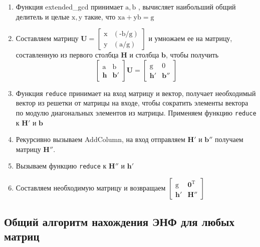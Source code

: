 \begin{enumerate}
\item Функция extended\_gcd принимает $ \mathrm{a, b} $ , вычисляет наибольший общий делитель и целые $ \mathrm{x, y} $ такие, что $ \mathrm{xa + yb = g} $
\item Составляем матрицу $ \mathbf{U}= \left[\begin{array}{cccc}
\mathrm{x} & \mathrm{(\text{-}b/g)} \\
\mathrm{y} & \mathrm{(a/g)} \end{array}\right] $ и умножаем ее на матрицу, составленную из первого столбца $ \mathbf{H} $ и столбца $ \mathbf{b} $, чтобы получить
$$ \left[\begin{array}{cccc}
\mathrm{a} & \mathrm{b} \\
\mathbf{h} & \mathbf{b}' \end{array}\right] \mathbf{U}=
\left[\begin{array}{cccc}
\mathrm{g} & \mathrm{0} \\
\mathbf{h}' & \mathbf{b}'' \end{array}\right] $$
\item Функция \verb!reduce! принимает на вход матрицу и вектор, получает необходимый вектор из решетки от матрицы на входе, чтобы сократить элементы вектора по модулю диагональных элементов из матрицы. Применяем функцию \verb!reduce! к $ \mathbf{H}' $ и $ \mathbf{b} $
\item Рекурсивно вызываем AddColumn, на вход отправляем $ \mathbf{H}' $ и $ \mathbf{b}'' $  получаем матрицу $ \mathbf{H}'' $.
\item Вызываем функцию \verb!reduce! к $ \mathbf{H}'' $ и $ \mathbf{h}' $
\item Составляем необходимую матрицу и возвращаем $ \left[\begin{array}{cccc}
\mathrm{g} & \mathbf{0}^\mathrm{T} \\
\mathbf{h}' & \mathbf{H}'' \end{array}\right] $
\end{enumerate}

\subsection{Общий алгоритм нахождения ЭНФ для любых матриц}

